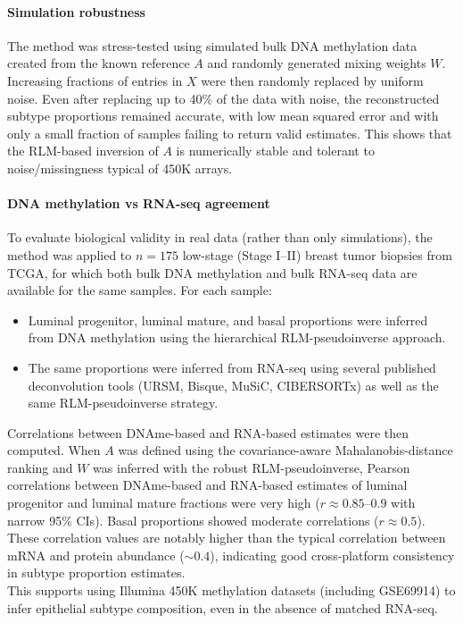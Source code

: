 \documentclass[10pt]{extarticle}
\begin{document}
\paragraph{Simulation robustness}
The method was stress-tested using simulated bulk DNA methylation data created from the known reference $A$ and randomly generated mixing weights $W$. Increasing fractions of entries in $X$ were then randomly replaced by uniform noise. Even after replacing up to 40\% of the data with noise, the reconstructed subtype proportions remained accurate, with low mean squared error and with only a small fraction of samples failing to return valid estimates. This shows that the RLM-based inversion of $A$ is numerically stable and tolerant to noise/missingness typical of 450K arrays.

\paragraph{DNA methylation vs RNA-seq agreement}
To evaluate biological validity in real data (rather than only simulations), the method was applied to $n=175$ low-stage (Stage I--II) breast tumor biopsies from TCGA, for which both bulk DNA methylation and bulk RNA-seq data are available for the same samples. For each sample:
\begin{itemize}[label=-]
    \item Luminal progenitor, luminal mature, and basal proportions were inferred from DNA methylation using the hierarchical RLM-pseudoinverse approach.
    \item The same proportions were inferred from RNA-seq using several published deconvolution tools (URSM, Bisque, MuSiC, CIBERSORTx) as well as the same RLM-pseudoinverse strategy.
\end{itemize}
Correlations between DNAme-based and RNA-based estimates were then computed. When $A$ was defined using the covariance-aware Mahalanobis-distance ranking and $W$ was inferred with the robust RLM-pseudoinverse, Pearson correlations between DNAme-based and RNA-based estimates of luminal progenitor and luminal mature fractions were very high ($r \approx 0.85$--$0.9$ with narrow 95\% CIs). Basal proportions showed moderate correlations ($r \approx 0.5$). These correlation values are notably higher than the typical correlation between mRNA and protein abundance ($\sim 0.4$), indicating good cross-platform consistency in subtype proportion estimates.\\
This supports using Illumina 450K methylation datasets (including GSE69914) to infer epithelial subtype composition, even in the absence of matched RNA-seq.
\end{document}
